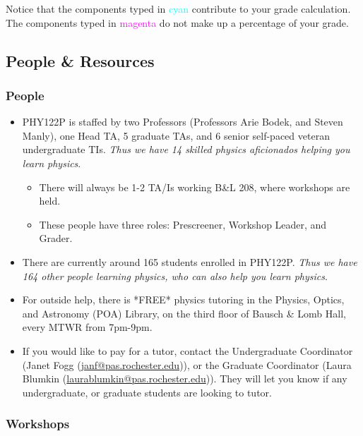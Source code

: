 \documentclass[12pt]{article}
\begin{document}
\noindent Notice that the components typed in \textcolor{cyan}{cyan} contribute to your grade calculation. The components typed in \textcolor{magenta}{magenta} do not make up a percentage of your grade. 

\subsection{People \& Resources} \label{sec:pr}

\subsubsection{People} \label{sec:p}

\begin{itemize}
	\item PHY122P is staffed by two Professors (Professors Arie Bodek, and Steven Manly), one Head TA, 5 graduate TAs, and 6 senior self-paced veteran undergraduate TIs. \emph{Thus we have 14 skilled physics aficionados helping you learn physics}.
	\begin{itemize}
		\item There will always be 1-2 TA/Is working B\&L 208, where workshops are held.
		\item These people have three roles: Prescreener, Workshop Leader, and Grader.
	\end{itemize}
	\item There are currently around 165 students enrolled in PHY122P. \emph{Thus we have 164 other people learning physics, who can also help you learn physics}.
	\item For outside help, there is *FREE* physics tutoring in the Physics, Optics, and Astronomy (POA) Library, on the third floor of Bausch \& Lomb Hall, every MTWR from 7pm-9pm.
	\item If you would like to pay for a tutor, contact the Undergraduate Coordinator (Janet Fogg (\href{mailto:janf@pas.rochester.edu}{janf@pas.rochester.edu})), or the Graduate Coordinator (Laura Blumkin (\href{mailto:laurablumkin@pas.rochester.edu}{laurablumkin@pas.rochester.edu})). They will let you know if any undergraduate, or graduate students are looking to tutor.
\end{itemize}

\setlength{\headheight}{15pt}

\subsubsection{Workshops} \label{sec:w}
\end{document}
